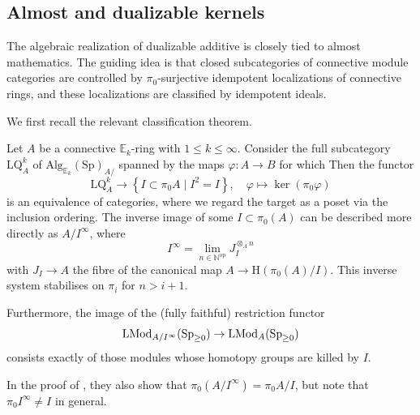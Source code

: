 \documentclass[a4paper,10pt, oneside]{amsart}
\begin{document}
	
	\subsection{Almost \infcats and dualizable kernels}

	
The algebraic realization of dualizable additive \infcats is closely tied to almost mathematics. The guiding idea is that closed subcategories of connective module categories are controlled by $\pi_0$-surjective idempotent localizations of connective rings, and these localizations are classified by idempotent ideals.

 We first recall the relevant classification theorem.

	
	\begin{thm}\label{almostalg}
		Let $A$ be a connective $\mathbb{E}_k$-ring with $1 \leq k \leq \infty$. Consider the full subcategory $\mathrm{LQ}^k_A$ of $ \mathrm{Alg}_{\mathbb{E}_k}(\mathrm{Sp})_{A /}$ spanned by the maps $\varphi: A \rightarrow B$ for which
		Then the functor
		$$
		\mathrm{LQ}^k_A \longrightarrow\left\{I \subset \pi_0 A \mid I^2=I\right\}, \quad \varphi \longmapsto \operatorname{ker}\left(\pi_0 \varphi\right)
		$$
		is an equivalence of categories, where we regard the target as a poset via the inclusion ordering. The inverse image of some $I \subset \pi_0(A)$ can be described more directly as $A / I^{\infty}$, where
		$$
		I^{\infty}=\lim _{n \in \mathbb{N}^{\mathrm{op}}} J_I^{\otimes_A n}
		$$
		with $J_I \rightarrow A$ the fibre of the canonical map $A \rightarrow \mathrm{H}\left(\pi_0(A) / I\right)$. This inverse system stabilises on $\pi_i$ for $n>i+1$.
		
		Furthermore, the image of the (fully faithful) restriction functor $$\operatorname{LMod}_{A / I^{\infty}}(\operatorname{Sp}_{\geq0})\rightarrow \operatorname{LMod}_A(\operatorname{Sp}_{\geq0})$$ consists exactly of those modules whose homotopy groups are killed by $I$.
		
	\end{thm}
	\begin{rem}\label{pi0almost}
		In the proof of \cite[Theorem B]{hebestreit2024note}, they also show that $\pi_0(A/I^\infty)=\pi_0A/I$, but note that $\pi_0I^\infty\neq I$ in general.
	\end{rem}
\end{document}
